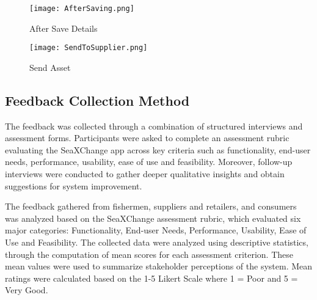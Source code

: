	\begin{figure}[H]
		\centering
		\texttt{[image: AfterSaving.png]}
		\caption{After Save Details}
		\label{fig:after_save}
	\end{figure}
	
	\begin{figure}[H]
		\centering
		\texttt{[image: SendToSupplier.png]}
		\caption{Send Asset}
		\label{fig:sendto_supplier}
	\end{figure}
	
\subsection{Feedback Collection Method}
	The feedback was collected through a combination of structured interviews and assessment forms. Participants were asked to complete an assessment rubric evaluating the SeaXChange app across key criteria such as functionality, end-user needs, performance, usability, ease of use and feasibility. Moreover, follow-up interviews were conducted to gather deeper qualitative insights and obtain suggestions for system improvement.
	
	The feedback gathered from fishermen, suppliers and retailers, and consumers was analyzed based on the SeaXChange assessment rubric, which evaluated six major categories: Functionality, End-user Needs, Performance, Usability, Ease of Use and Feasibility. The collected data were analyzed using descriptive statistics, through the computation of mean scores for each assessment criterion. These mean values were used to summarize stakeholder perceptions of the system. Mean ratings were calculated based on the 1-5 Likert Scale where 1 = Poor and 5 = Very Good.
	
